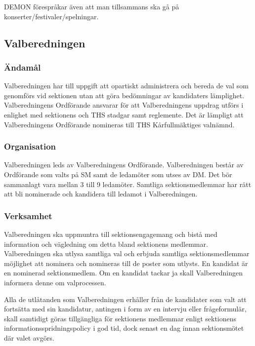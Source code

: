 \documentclass{dgovdoc}
\begin{document}
DEMON förespråkar även att man tillsammans ska gå på
konserter/festivaler/spelningar.

\subsection{Valberedningen}

\subsubsection{Ändamål}

Valberedningen har till uppgift att opartiskt administrera och bereda de
val som genomförs vid sektionen utan att göra bedömningar av kandidaters
lämplighet. Valberedningens Ordförande ansvarar för att Valberedningens
uppdrag utförs i enlighet med sektionens och THS stadgar samt reglemente.
Det är lämpligt att Valberedningens Ordförande nomineras till
THS Kårfullmäktiges valnämnd.

\subsubsection{Organisation}

Valberedningen leds av Valberedningens Ordförande. Valberedningen består av
Ordförande som valts på SM samt de ledamöter som utses av DM. Det bör
sammanlagt vara mellan 3 till 9 ledamöter. Samtliga sektionsmedlemmar
har rätt att bli nominerade och kandidera till ledamot i Valberedningen.

\subsubsection{Verksamhet}

Valberedningen ska uppmuntra till sektionsengagemang och bistå med information
och vägledning om detta bland sektionens medlemmar. Valberedningen ska utlysa
samtliga val och erbjuda samtliga sektionsmedlemmar möjlighet att nominera och
nomineras till de poster som utlysts. En kandidat är en nominerad sektionsmedlem.
Om en kandidat tackar ja skall Valberedningen informera denne om valprocessen.

Alla de utlåtanden som Valberedningen erhåller från de kandidater som valt att
fortsätta med sin kandidatur, antingen i form av en intervju eller frågeformulär,
skall samtidigt göras tillgängliga för sektionens medlemmar enligt sektionens
informationsspridningspolicy i god tid, dock senast en dag innan sektionsmötet
där valet avgörs.
\end{document}
